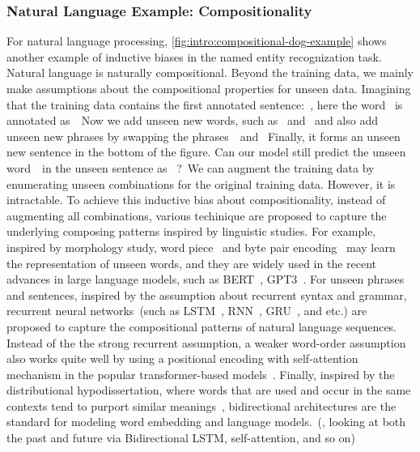 \subsubsection{Natural Language Example: Compositionality}
\label{sssec:intro:nlp-example}

For natural language processing,
\autoref{fig:intro:compositional-dog-example} shows another example of
inductive biases in the named entity recognization task. Natural
language is naturally compositional. Beyond the training data, we
mainly make assumptions about the compositional properties for unseen
data. Imagining that the training data contains the first annotated
sentence:~, here the word~ is annotated as~~Now
we add unseen new words, such as~ and~
and also add unseen new phrases by swapping the phrases~~and~ Finally, it forms an unseen new
sentence in the bottom of the figure. Can our model still predict the
unseen word~~in the unseen sentence as
~?~We can augment the training data by enumerating
unseen combinations for the original training data. However, it is
intractable. To achieve this inductive bias about compositionality,
instead of augmenting all combinations, various techinique are
proposed to capture the underlying composing patterns inspired by
linguistic studies. For example, inspired by morphology study, word
piece~\citep{schuster2012japanese} and byte pair
encoding~\citep[BPE,][]{sennrich2016neural} may learn the
representation of unseen words, and they are widely used in the recent
advances in large language models, such as
BERT~\citep{devlin2019bert}, GPT3~\citep{brown2020language}. For
unseen phrases and sentences, inspired by the assumption about
recurrent syntax and grammar, recurrent neural networks~(such as
LSTM~\citep{hochreiter97lstm}, RNN~\citep{mesnil13rnn},
GRU~\citep{chung14gru}, and etc.)  are proposed to capture the
compositional patterns of natural language sequences. Instead of the
the strong recurrent assumption, a weaker word-order assumption also
works quite well by using a positional encoding with self-attention
mechanism in the popular transformer-based
models~\citep{NIPS2017_7181}. Finally, inspired by the distributional
hypodissertation, where words that are used and occur in the same contexts
tend to purport similar meanings~\cite{harris1954distributional},
bidirectional architectures are the standard for modeling word
embedding and language models.~(\eg, looking at both the past and
future via Bidirectional LSTM, self-attention, and so on)

